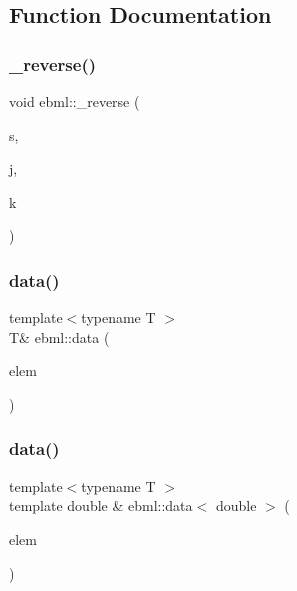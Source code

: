 \subsection{Function Documentation}
\mbox{\label{namespaceebml_ac1a0abdc17f3f647cf7d1fa990622b89}} 
\subsubsection{\texorpdfstring{\+\_\+reverse()}{\_reverse()}}
{\footnotesize\ttfamily void ebml\+::\+\_\+reverse (\begin{DoxyParamCaption}\item[{char $\ast$}]{s,  }\item[{unsigned int}]{j,  }\item[{unsigned int}]{k }\end{DoxyParamCaption})}

\mbox{\label{namespaceebml_a6365629b3110a3c5d0cde94d08aac26c}} 
\subsubsection{\texorpdfstring{data()}{data()}\hspace{0.1cm}{\footnotesize\ttfamily [1/5]}}
{\footnotesize\ttfamily template$<$typename T $>$ \\
T\& ebml\+::data (\begin{DoxyParamCaption}\item[{const \mbox{\hyperlink{classebml_1_1childSlot__t}{child\+Slot\+\_\+t}} \&}]{elem }\end{DoxyParamCaption})}

\mbox{\label{namespaceebml_a4edfd02f8910c0abfd4bbbf928f92d9e}} 
\subsubsection{\texorpdfstring{data()}{data()}\hspace{0.1cm}{\footnotesize\ttfamily [2/5]}}
{\footnotesize\ttfamily template$<$typename T $>$ \\
template double \& ebml\+::data$<$ double $>$ (\begin{DoxyParamCaption}\item[{const \mbox{\hyperlink{namespaceebml_adad533b7705a16bb360fe56380c5e7be}{ebml\+Element\+\_\+sp}} \&}]{elem }\end{DoxyParamCaption})}

